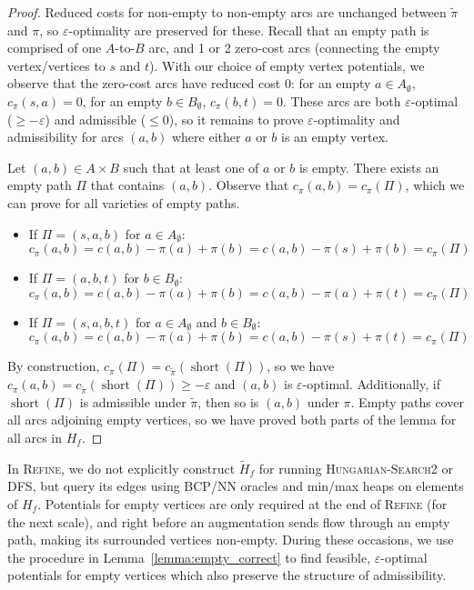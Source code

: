 \documentclass[11pt]{article}
\def\eps{\varepsilon}
\def\short{\operatorname{short}}
\theoremstyle{plain}
\numberwithin{figure}{section}
\begin{document}
\begin{proof}
Reduced costs for non-empty to non-empty arcs are unchanged between
$\tilde{\pi}$ and $\pi$, so $\eps$-optimality are preserved for these.
Recall that an empty path is comprised of one $A$-to-$B$ arc, and 1 or 2
zero-cost arcs (connecting the empty vertex/vertices to $s$ and $t$).
With our choice of empty vertex potentials, we observe that the zero-cost arcs
have reduced cost 0:
for an empty $a \in A_\emptyset$, $c_\pi(s, a) = 0$, for an empty
$b \in B_\emptyset$, $c_\pi(b, t) = 0$.
These arcs are both $\eps$-optimal ($\geq -\eps$) and admissible ($\leq 0$), so
it remains to prove $\eps$-optimality and admissibility for arcs $(a, b)$ where
either $a$ or $b$ is an empty vertex.

Let $(a, b) \in A \times B$ such that at least one of $a$ or $b$ is empty.
There exists an empty path $\Pi$ that contains $(a, b)$.
Observe that $c_\pi(a, b) = c_\pi(\Pi)$,
which we can prove for all varieties of empty paths.
\begin{itemize}
\item If $\Pi = (s, a, b)$ for $a \in A_\emptyset$:
	\begin{equation*}
	c_\pi(a, b) = c(a, b) - \pi(a) + \pi(b) = c(a, b) - \pi(s) + \pi(b) = c_\pi(\Pi)
	\end{equation*}
\item If $\Pi = (a, b, t)$ for $b \in B_\emptyset$:
	\begin{equation*}
	c_\pi(a, b) = c(a, b) - \pi(a) + \pi(b) = c(a, b) - \pi(a) + \pi(t) = c_\pi(\Pi)
	\end{equation*}
\item If $\Pi = (s, a, b, t)$ for $a \in A_\emptyset$ and $b \in B_\emptyset$:
	\begin{equation*}
	c_\pi(a, b) = c(a, b) - \pi(a) + \pi(b) = c(a, b) - \pi(s) + \pi(t) = c_\pi(\Pi)
	\end{equation*}
\end{itemize}
By construction, $c_\pi(\Pi) = c_{\tilde{\pi}}(\short(\Pi))$, so we have
$c_\pi(a, b) = c_{\tilde{\pi}}(\short(\Pi)) \geq -\eps$ and $(a, b)$ is
$\eps$-optimal.
Additionally, if $\short(\Pi)$ is admissible under $\tilde{\pi}$, then so is
$(a, b)$ under $\pi$.
Empty paths cover all arcs adjoining empty vertices, so we have proved both
parts of the lemma for all arcs in $H_f$.
\end{proof}

In \textsc{Refine}, we do not explicitly construct $\tilde{H}_f$ for running
\textsc{Hungarian-Search2} or \textsc{DFS}, but query its edges using BCP/NN
oracles and min/max heaps on elements of $H_f$.
Potentials for empty vertices are only required at the end of \textsc{Refine}
(for the next scale), and right before an augmentation sends flow through an
empty path, making its surrounded vertices non-empty.
During these occasions, we use the procedure in Lemma~\ref{lemma:empty_correct}
to find feasible, $\eps$-optimal potentials for empty vertices which
also preserve the structure of admissibility.
\end{document}
